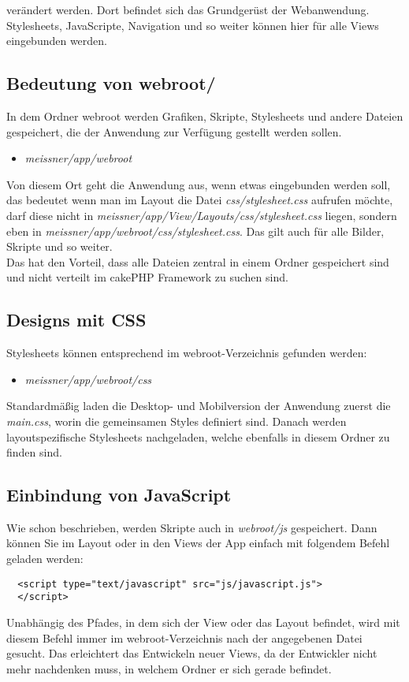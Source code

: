 verändert werden. Dort befindet sich das Grundgerüst der Webanwendung. Stylesheets, JavaScripte, Navigation und so weiter können hier für alle Views eingebunden werden. 

\subsection{Bedeutung von webroot/}
In dem Ordner webroot werden Grafiken, Skripte, Stylesheets und andere Dateien gespeichert, die der Anwendung zur Verfügung gestellt werden sollen. 

\begin{itemize}
	\item[] \emph{meissner/app/webroot}
\end{itemize}

Von diesem Ort geht die Anwendung aus, wenn etwas eingebunden werden soll, das bedeutet wenn man im Layout die Datei \emph{css/stylesheet.css} aufrufen möchte, darf diese nicht in \emph{meissner/app/View/Layouts/css/stylesheet.css} liegen, sondern eben in \emph{meissner/app/webroot/css/stylesheet.css}. Das gilt auch für alle Bilder, Skripte und so weiter.\\
Das hat den Vorteil, dass alle Dateien zentral in einem Ordner gespeichert sind und nicht verteilt im cakePHP Framework zu suchen sind.

\subsection{Designs mit CSS}
Stylesheets können entsprechend im webroot-Verzeichnis gefunden werden:

\begin{itemize}
	\item[] \emph{meissner/app/webroot/css}
\end{itemize}

Standardmäßig laden die Desktop- und Mobilversion der Anwendung zuerst die \emph{main.css}, worin die gemeinsamen Styles definiert sind. Danach werden layoutspezifische Stylesheets nachgeladen, welche ebenfalls in diesem Ordner zu finden sind. 

\subsection{Einbindung von JavaScript}
Wie schon beschrieben, werden Skripte auch in \emph{webroot/js} gespeichert. Dann können Sie im Layout oder in den Views der App einfach mit folgendem Befehl geladen werden:

\begin{lstlisting}
  <script type="text/javascript" src="js/javascript.js">
  </script>
\end{lstlisting}

Unabhängig des Pfades, in dem sich der View oder das Layout befindet, wird mit diesem Befehl immer im webroot-Verzeichnis nach der angegebenen Datei gesucht. Das erleichtert das Entwickeln neuer Views, da der Entwickler nicht mehr nachdenken muss, in welchem Ordner er sich gerade befindet.
